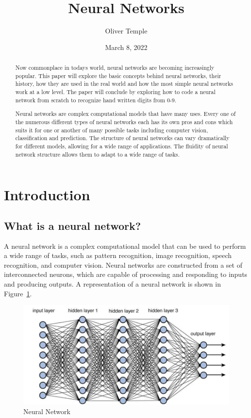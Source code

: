 \documentclass[titlepage]{article}
\title{Neural Networks}
\author{Oliver Temple}
\date{March 8, 2022}
\begin{document}
\maketitle

\begin{abstract}
    Now commonplace in todays world, neural networks are becoming increasingly popular. This paper will explore the basic concepts behind neural networks, their history, how they are used in the real world and how the most simple neural networks work at a low level. The paper will conclude by exploring how to code a neural network from scratch to recognize hand written digits from 0-9.

    Neural networks are complex computational models that have many uses. Every one of the numerous different types of neural networks each has its own pros and cons which suits it for one or another of many possible tasks including computer vision, classification and prediction. The structure of neural networks can vary dramatically for different models, allowing for a wide range of applications. The fluidity of neural network structure allows them to adapt to a wide range of tasks.
    
\end{abstract}
\tableofcontents
\newpage
\section{Introduction}
\subsection{What is a neural network?}
A neural network is a complex computational model that can be used to perform a wide range of tasks, such as pattern recognition, image recognition, speech recognition, and computer vision. Neural networks are constructed from a set of interconnected neurons, which are capable of processing and responding to inputs and producing outputs. A representation of a neural network is shown in Figure~\ref{fig:neural_network}.

\begin{figure}[h!]
    \includegraphics[width=\textwidth]{./assets/neural_network.jpeg}
    \caption{Neural Network}
    \label{fig:neural_network}
\end{figure}
\end{document}
